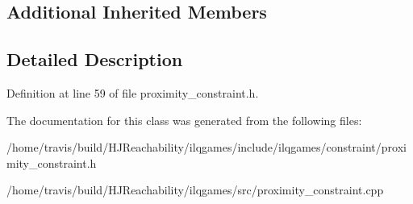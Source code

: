 \subsection*{Additional Inherited Members}


\subsection{Detailed Description}


Definition at line 59 of file proximity\+\_\+constraint.\+h.



The documentation for this class was generated from the following files\+:\begin{DoxyCompactItemize}
\item 
/home/travis/build/\+H\+J\+Reachability/ilqgames/include/ilqgames/constraint/proximity\+\_\+constraint.\+h\item 
/home/travis/build/\+H\+J\+Reachability/ilqgames/src/proximity\+\_\+constraint.\+cpp\end{DoxyCompactItemize}
